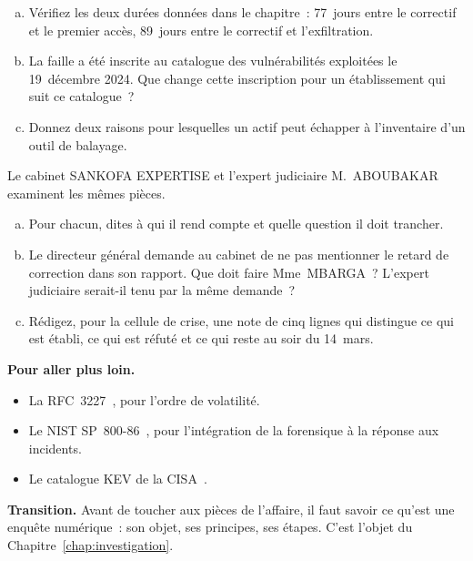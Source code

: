 \begin{boxexo}[title={\ding{45}\quad Exercice~0.3. Le compte des jours \niveaumoyen}]
\begin{enumerate}[(a)]
    \item Vérifiez les deux durées données dans le chapitre~: 77~jours entre
          le correctif et le premier accès, 89~jours entre le correctif et
          l'exfiltration.
    \item La faille a été inscrite au catalogue des vulnérabilités
          exploitées le 19~décembre 2024. Que change cette inscription pour
          un établissement qui suit ce catalogue~?
    \item Donnez deux raisons pour lesquelles un actif peut échapper à
          l'inventaire d'un outil de balayage.
\end{enumerate}
\end{boxexo}

\begin{boxexo}[title={\ding{45}\quad Exercice~0.4. Deux enquêtes, deux obligations \niveauexpert}]
Le cabinet SANKOFA EXPERTISE et l'expert judiciaire M.~ABOUBAKAR examinent
les mêmes pièces.
\begin{enumerate}[(a)]
    \item Pour chacun, dites à qui il rend compte et quelle question il doit
          trancher.
    \item Le directeur général demande au cabinet de ne pas mentionner le
          retard de correction dans son rapport. Que doit faire Mme~MBARGA~?
          L'expert judiciaire serait-il tenu par la même demande~?
    \item Rédigez, pour la cellule de crise, une note de cinq lignes qui
          distingue ce qui est établi, ce qui est réfuté et ce qui reste
          \NEK{} au soir du 14~mars.
\end{enumerate}
\end{boxexo}

\bigskip

\begin{boxinfo}
\textbf{Pour aller plus loin.}
\begin{itemize}
    \item La RFC~3227~\cite{rfc3227}, pour l'ordre de volatilité.
    \item Le NIST SP~800-86~\cite{nist80086}, pour l'intégration de la
          forensique à la réponse aux incidents.
    \item Le catalogue KEV de la CISA~\cite{cisakev}.
\end{itemize}
\end{boxinfo}

\begin{boxinfo}
\textbf{Transition.} Avant de toucher aux pièces de l'affaire, il faut
savoir ce qu'est une enquête numérique~: son objet, ses principes, ses
étapes. C'est l'objet du Chapitre~\ref{chap:investigation}.
\end{boxinfo}
